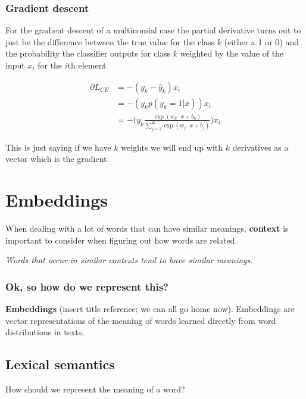 \documentclass[11pt]{article}
\begin{document}
\subsubsection{Gradient descent}

For the gradient descent of a multinomial case the partial derivative turns out
to just be the difference between the true value for the class $k$ (either a 1
or 0) and the probability the classifier outputs for class $k$ weighted by the
value of the input $x_i$ for the $i$th element

\begin{align*}
	\partial L_{CE} & = -(y_k - \hat{y}_k)x_i                                                                   \\
	                & = -(y_k p(y_k=1|x))x_i                                                                    \\
	                & = - \Big(y_k \frac{\exp(w_k \cdot x + b_k)}{\sum_{j=1}^K \exp(w_j \cdot x + b_j)}\Big)x_i
\end{align*}

This is just saying if we have $k$ weights we will end up with $k$ derivatives
as a vector which is the gradient.


\section{Embeddings}

When dealing with a lot of words that can have similar meanings,
\textbf{context} is important to consider when figuring out how words are
related.

\textit{Words that occur in similar contexts tend to have similar meanings.}

\subsubsection*{Ok, so how do we represent this?}

\textbf{Embeddings} (insert title reference; we can all go home now). Embeddings
are vector representations of the meaning of words learned directly from word
distributions in texts.

\subsection{Lexical semantics}

How should we represent the meaning of a word?
\end{document}
